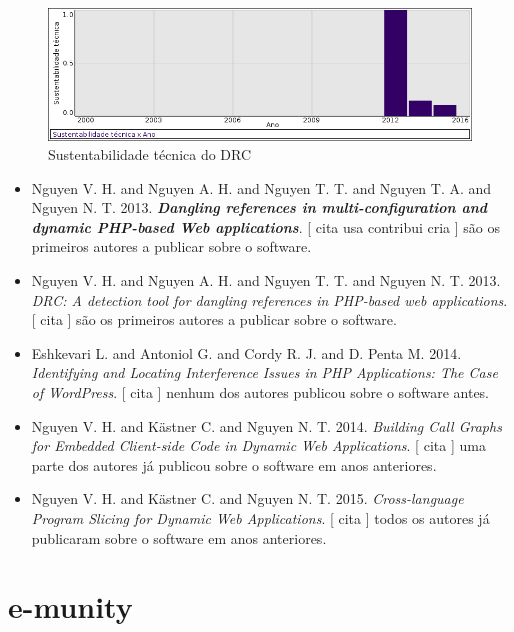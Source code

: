 \begin{figure}[h]
  \center
  \includegraphics[scale=0.50]{imagens/softwares-charts/drc.png}
  \caption{Sustentabilidade técnica do DRC}
\end{figure}


\begin{itemize}
\item Nguyen V. H. and Nguyen A. H. and Nguyen T. T. and Nguyen T. A. and Nguyen N. T.
      2013.
        \textbf{\textit{ Dangling references in multi-configuration and dynamic PHP-based Web applications}}.
      [
          cita
          usa
          contribui
          cria
      ]
são os primeiros autores a publicar sobre o software.
\item Nguyen V. H. and Nguyen A. H. and Nguyen T. T. and Nguyen N. T.
      2013.
        \textit{ DRC: A detection tool for dangling references in PHP-based web applications}.
      [
          cita
      ]
são os primeiros autores a publicar sobre o software.
\item Eshkevari L. and Antoniol G. and Cordy R. J. and D. Penta M.
      2014.
        \textit{ Identifying and Locating Interference Issues in PHP Applications: The Case of WordPress}.
      [
          cita
      ]
nenhum dos autores publicou sobre o software antes.
\item Nguyen V. H. and K\"{a}stner C. and Nguyen N. T.
      2014.
        \textit{ Building Call Graphs for Embedded Client-side Code in Dynamic Web Applications}.
      [
          cita
      ]
uma parte dos autores já publicou sobre o software em anos anteriores.
\item Nguyen V. H. and K\"{a}stner C. and Nguyen N. T.
      2015.
        \textit{ Cross-language Program Slicing for Dynamic Web Applications}.
      [
          cita
      ]
todos os autores já publicaram sobre o software em anos anteriores.
\end{itemize}
\section{e-munity}

